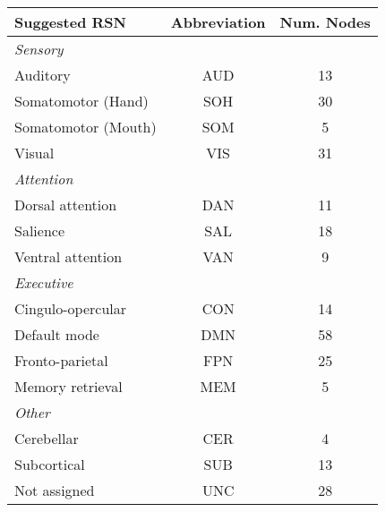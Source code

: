 \begin{tabular}{lcc}
\toprule 
Suggested RSN & Abbreviation & Num. Nodes \\ 
\midrule 
\textit{Sensory} & & \\
	\hspace{3pt}Auditory  			&  AUD & 13 \\ 
	\hspace{3pt}Somatomotor (Hand)	&  SOH & 30 \\
	\hspace{3pt}Somatomotor (Mouth)	&  SOM & 5 \\
	\hspace{3pt}Visual	 			&  VIS & 31 \\ 
\textit{Attention} & & \\
	\hspace{3pt}Dorsal attention  	&  DAN & 11	\\ 
	\hspace{3pt}Salience		  	&  SAL & 18 \\ 
	\hspace{3pt}Ventral attention  	&  VAN & 9 \\ 
\textit{Executive} & & \\
	\hspace{3pt}Cingulo-opercular 	& CON & 14 \\ 
	\hspace{3pt}Default mode		& DMN & 58 \\
	\hspace{3pt}Fronto-parietal  	& FPN & 25 \\ 
	\hspace{3pt}Memory retrieval	& MEM & 5 \\
\textit{Other} & & \\
	\hspace{3pt}Cerebellar			& CER & 4  \\
	\hspace{3pt}Subcortical			& SUB & 13 \\
	\hspace{3pt}Not assigned 		& UNC & 28 \\ 
\bottomrule 
\end{tabular}